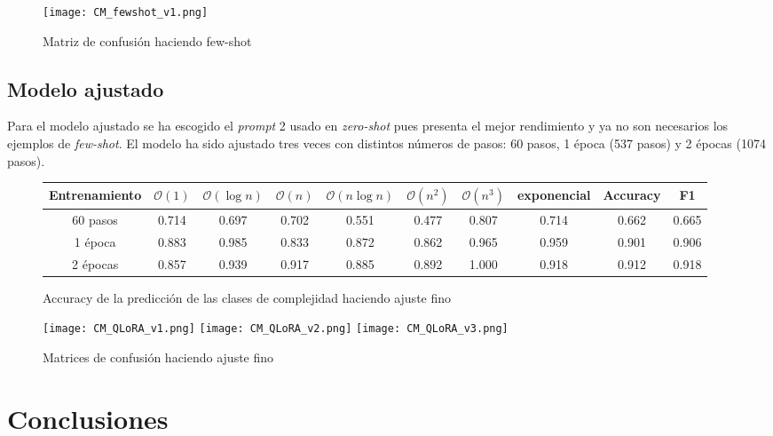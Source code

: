 \documentclass[12pt,twoside]{article}
\begin{document}
\begin{figure}[H]
  \centering
    \texttt{[image: CM\_fewshot\_v1.png]}
  \caption{Matriz de confusión haciendo few-shot}
  \label{fig:confmat_fs}
\end{figure}

\subsection{Modelo ajustado}
Para el modelo ajustado se ha escogido el \textit{prompt} 2 usado en \textit{zero-shot} pues presenta el mejor rendimiento y ya no son necesarios los ejemplos de \textit{few-shot}. El modelo ha sido ajustado tres veces con distintos números de pasos: 60 pasos, 1 época (537 pasos) y 2 épocas (1074 pasos).

\begin{figure}[H]
    \small
    \begin{tabular}{c|c c c c c c c|c c}
        Entrenamiento & $\mathcal{O}(1)$ & $\mathcal{O}(\log n)$ & $\mathcal{O}(n)$ & $\mathcal{O}(n\log n)$ & $\mathcal{O}(n^2)$ & $\mathcal{O}(n^3)$ & exponencial & Accuracy & F1 \\ \hline
        60 pasos & 0.714 & 0.697 & 0.702 & 0.551 & 0.477 & 0.807 & 0.714 & 0.662 & 0.665 \\
        1 época & 0.883 & 0.985 & 0.833 & 0.872 & 0.862 & 0.965 & 0.959 & 0.901 & 0.906 \\
        2 épocas & 0.857 & 0.939 & 0.917 & 0.885 & 0.892 & 1.000 & 0.918 & 0.912 & 0.918 
    \end{tabular}
    \normalsize
    \centering
    \caption{Accuracy de la predicción de las clases de complejidad haciendo ajuste fino}
    \label{fig:tab_QLoRA}
\end{figure}

\begin{figure}[H]
  \centering
    \texttt{[image: CM\_QLoRA\_v1.png]}
    \texttt{[image: CM\_QLoRA\_v2.png]}
    \texttt{[image: CM\_QLoRA\_v3.png]}
  \caption{Matrices de confusión haciendo ajuste fino}
  \label{fig:confmat_QLoRA}
\end{figure}


\section{Conclusiones}
\end{document}
